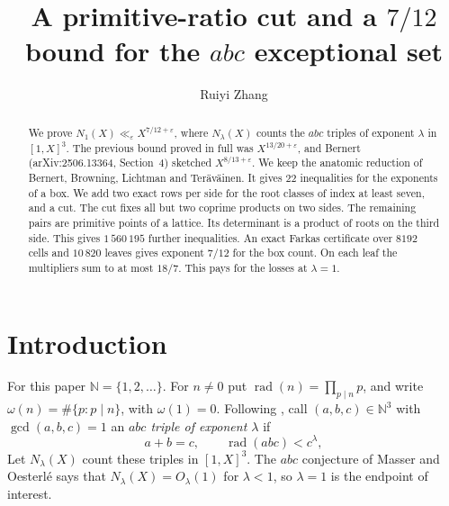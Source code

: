 \documentclass{amsart}
\numberwithin{equation}{section}
\numberwithin{table}{section}
\newcommand{\rad}{\operatorname{rad}}
\newcommand{\N}{\mathbb{N}}
\begin{document}
\title[The $7/12$ bound for the $abc$ exceptional set]{A primitive-ratio cut and a $7/12$ bound for the $abc$ exceptional set}
\author{Ruiyi Zhang}
\address{Independent Researcher, Columbia, Maryland, USA}

\begin{abstract}
We prove $N_1(X)\ll_\varepsilon X^{7/12+\varepsilon}$, where $N_\lambda(X)$
counts the $abc$ triples of exponent $\lambda$ in $[1,X]^3$. The previous bound
proved in full was $X^{13/20+\varepsilon}$, and Bernert (arXiv:2506.13364,
Section~4) sketched $X^{8/13+\varepsilon}$. We keep the anatomic reduction of
Bernert, Browning, Lichtman and Ter\"av\"ainen. It gives $22$ inequalities for
the exponents of a box. We add two exact rows per side for the root classes of
index at least seven, and a cut. The cut fixes all but two coprime products on
two sides. The remaining pairs are primitive points of a lattice. Its
determinant is a product of roots on the third side. This gives
$1\,560\,195$ further inequalities. An exact Farkas certificate over $8192$
cells and $10\,820$ leaves gives exponent $7/12$ for the box count. On each
leaf the multipliers sum to at most $18/7$. This pays for the losses at
$\lambda=1$.
\end{abstract}

\maketitle

\section{Introduction}\label{sec:intro}

For this paper $\N=\{1,2,\ldots\}$. For $n\ne0$ put
$\rad(n)=\prod_{p\mid n}p$, and write $\omega(n)=\#\{p:p\mid n\}$,
with $\omega(1)=0$. Following \cite{BBLT}, call
$(a,b,c)\in\N^3$ with $\gcd(a,b,c)=1$ an \emph{$abc$ triple of exponent
$\lambda$} if
\begin{equation}\label{eq:triple}
 a+b=c,\qquad \rad(abc)<c^{\lambda},
\end{equation}
Let $N_\lambda(X)$ count these triples in $[1,X]^3$. The $abc$ conjecture of Masser and Oesterl\'e says that
$N_\lambda(X)=O_\lambda(1)$ for $\lambda<1$, so $\lambda=1$ is the endpoint of
interest.
\end{document}

